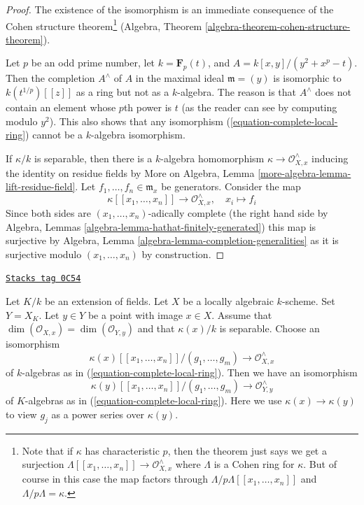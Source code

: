 \begin{proof}
The existence of the isomorphism is an immediate consequence of
the Cohen structure theorem\footnote{Note that if $\kappa$ has
characteristic $p$, then the theorem just says we get a surjection
$\Lambda[[x_1, \ldots, x_n]] \to \mathcal{O}_{X, x}^\wedge$ where
$\Lambda$ is a Cohen ring for $\kappa$. But of course in this
case the map factors through $\Lambda/p\Lambda[[x_1, \ldots, x_n]]$
and $\Lambda/p\Lambda = \kappa$.}
(Algebra, Theorem \ref{algebra-theorem-cohen-structure-theorem}).

\medskip\noindent
Let $p$ be an odd prime number, let $k = \mathbf{F}_p(t)$, and
$A = k[x, y]/(y^2 + x^p - t)$. Then the completion $A^\wedge$ of $A$
in the maximal ideal
$\mathfrak m = (y)$ is isomorphic to $k(t^{1/p})[[z]]$ as a ring
but not as a $k$-algebra. The reason is that $A^\wedge$
does not contain an element whose $p$th power is $t$ (as the reader
can see by computing modulo $y^2$).
This also shows that any isomorphism (\ref{equation-complete-local-ring})
cannot be a $k$-algebra isomorphism.

\medskip\noindent
If $\kappa/k$ is separable, then there is a $k$-algebra
homomorphism $\kappa \to \mathcal{O}_{X, x}^\wedge$
inducing the identity on residue fields by
More on Algebra, Lemma \ref{more-algebra-lemma-lift-residue-field}.
Let $f_1, \ldots, f_n \in \mathfrak m_x$ be generators.
Consider the map
$$
\kappa[[x_1, \ldots, x_n]] \longrightarrow \mathcal{O}_{X, x}^\wedge,\quad
x_i \longmapsto f_i
$$
Since both sides are $(x_1, \ldots, x_n)$-adically complete
(the right hand side by
Algebra, Lemmas \ref{algebra-lemma-hathat-finitely-generated})
this map is surjective by
Algebra, Lemma \ref{algebra-lemma-completion-generalities}
as it is surjective modulo $(x_1, \ldots, x_n)$ by
construction.
\end{proof}

\begin{lemma}
\label{varieties-lemma-base-change-complete-local-ring}
\href{https://stacks.math.columbia.edu/tag/0C54}{\texttt{Stacks tag 0C54}}

Let $K/k$ be an extension of fields. Let $X$ be a locally algebraic
$k$-scheme. Set $Y = X_K$. Let $y \in Y$ be a point with image $x \in X$.
Assume that $\dim(\mathcal{O}_{X, x}) = \dim(\mathcal{O}_{Y, y})$
and that $\kappa(x)/k$ is separable.
Choose an isomorphism
$$
\kappa(x)[[x_1, \ldots, x_n]]/(g_1, \ldots, g_m) \longrightarrow
\mathcal{O}_{X, x}^\wedge
$$
of $k$-algebras as in (\ref{equation-complete-local-ring}).
Then we have an isomorphism
$$
\kappa(y)[[x_1, \ldots, x_n]]/(g_1, \ldots, g_m) \longrightarrow
\mathcal{O}_{Y, y}^\wedge
$$
of $K$-algebras as in (\ref{equation-complete-local-ring}). Here we use
$\kappa(x) \to \kappa(y)$ to view $g_j$ as a power series
over $\kappa(y)$.
\end{lemma}

